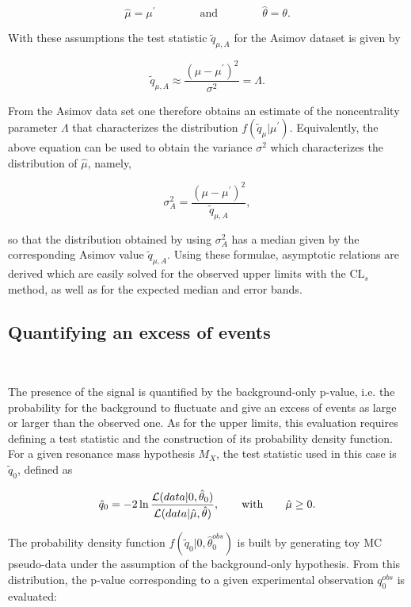 \begin{equation}
\hat{\mu} = \mu^\prime \qquad\qquad \mathrm{and} \qquad\qquad \hat{\theta} = \theta.
\end{equation}

With these assumptions the test statistic $\tilde{q}_{\mu,A}$ for the Asimov dataset is given by 

\begin{equation}
\tilde{q}_{\mu,A} \approx \frac{(\mu-\mu^\prime)^2}{\sigma^2} = \Lambda.
\end{equation}

From the Asimov data set one therefore obtains an estimate of the noncentrality parameter $\Lambda$ that characterizes the distribution $f(\tilde{q}_\mu|\mu^\prime)$.
Equivalently, the above equation can be used to obtain the variance $\sigma^2$ which characterizes the distribution of $\hat{\mu}$, namely,

\begin{equation}
\sigma_A^2 = \frac{(\mu-\mu^\prime)^2}{\tilde{q}_{\mu,A}},
\end{equation}

so that the distribution obtained by using $\sigma_A^2$ has a median given by the corresponding Asimov value $\tilde{q}_{\mu,A}$. 
Using these formulae, asymptotic relations are derived which are easily solved for the observed upper limits with the $\mathrm{CL}_s$ method,
as well as for the expected median and error bands.

\subsection{Quantifying an excess of events}~\label{subsec:pvalue}

The presence of the signal is quantified by the background-only p-value, i.e. the probability for the background to fluctuate
and give an excess of events as large or larger than the observed one.
As for the upper limits, this evaluation requires defining a test statistic and the construction of its probability density function.
For a given resonance mass hypothesis $M_X$, the test statistic used in this case is $\tilde{q}_0$, defined as

\begin{equation}
\tilde{q}_0 = -2\ln\frac{{\cal L}(data | 0,\hat{\theta}_0)}{{\cal L}( data | \hat{\mu},\hat{\theta})},\qquad \mathrm{with} \qquad \hat{\mu} \geq 0.
\end{equation}

The probability density function $f(\tilde{q}_0|0,\hat{\theta}_0^{obs})$ is built by generating toy MC pseudo-data under the assumption of the background-only hypothesis.
From this distribution, the p-value corresponding to a given experimental observation $q_0^{obs}$ is evaluated:

